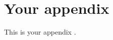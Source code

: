\chapter{Your appendix}
\label{appendix: codes}
\fancyhead{} %
\begin{refsection}


This is your appendix \autocite{deng2017volumetric}.


\pagebreak
{}

\begin{singlespacing}
\printbibliography[heading=subbibliography]
\end{singlespacing}

\end{refsection}